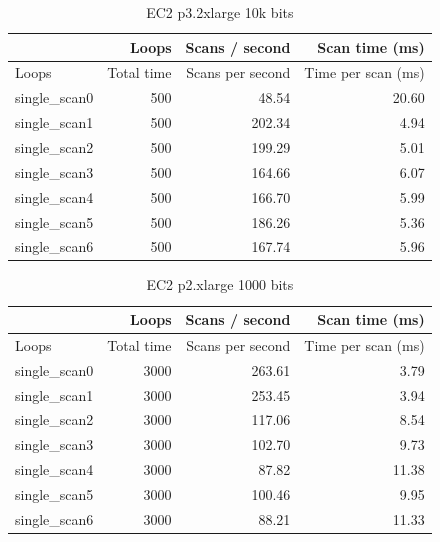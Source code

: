 \begin{table}[!htb]
\centering
\begin{tabular}{| l | r | r | r |}
    \hline
    & Loops & Scans / second & Scan time (ms) \\ \hline
    Loops & Total time & Scans per second & Time per scan (ms) \\
    single\_scan0 & 500 & 48.54 & 20.60 \\
    single\_scan1 & 500 & 202.34 & 4.94 \\
    single\_scan2 & 500 & 199.29 & 5.01 \\
    single\_scan3 & 500 & 164.66 & 6.07 \\
    single\_scan4 & 500 & 166.70 & 5.99 \\
    single\_scan5 & 500 & 186.26 & 5.36 \\
    single\_scan6 & 500 & 167.74 & 5.96 \\
\end{tabular}
\caption{EC2 p3.2xlarge 10k bits
\label{tab:perf-imac-256}}
\end{table}

\begin{table}[!htb]
\centering
\begin{tabular}{| l | r | r | r |}
    \hline
    & Loops & Scans / second & Scan time (ms) \\ \hline
    Loops & Total time & Scans per second & Time per scan (ms) \\
    single\_scan0 & 3000 & 263.61 & 3.79 \\
    single\_scan1 & 3000 & 253.45 & 3.94 \\
    single\_scan2 & 3000 & 117.06 & 8.54 \\
    single\_scan3 & 3000 & 102.70 & 9.73 \\
    single\_scan4 & 3000 & 87.82 & 11.38 \\
    single\_scan5 & 3000 & 100.46 & 9.95 \\
    single\_scan6 & 3000 & 88.21 & 11.33 \\
\end{tabular}
\caption{EC2 p2.xlarge 1000 bits
\label{tab:perf-imac-256}}
\end{table}


